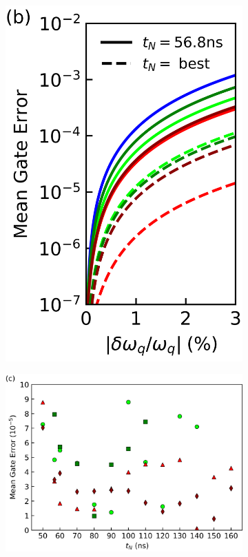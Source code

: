 \documentclass[
  amsfonts,
  amsmath,
  tbtags,
  amssymb,
  aps,
  nobibnotes,
  twocolumn,
]{revtex4-2}
\begin{document}
\begin{figure}[ht]
\begin{subfigure}{.4\linewidth}
    \includegraphics[width=\linewidth]{assets/f2b.png}
  \end{subfigure}
  
  \begin{subfigure}{\linewidth}
    \includegraphics[width=\linewidth]{assets/f2c.png}
  \end{subfigure}
  

\end{figure}
\end{document}
